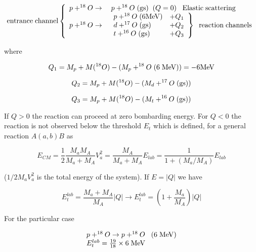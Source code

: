 \begin{equation}
{\rm entrance\;channel} \left\{
\begin{array}{rl}
p+^{18}O \rightarrow & \;p + ^{18}O \;({\rm gs})\;\; (Q=0) \;\;\; {\rm Elastic\; scattering} \\
p+^{18}O \rightarrow & \left. \begin{array}{ll}
     p + ^{18}O \;({\rm 6 MeV}) & + Q_1 \\
     d + ^{17}O \;({\rm gs})    & + Q_2 \\
     t + ^{16}O \;({\rm gs})    & + Q_3
		 \end{array} \right\} \;\; {\rm reaction\;channels}
\end{array}
\right.
\end{equation}

\noindent where

\begin{equation}
Q_1 = M_p + M(^{18}O) - (M_p + ^{18}O \; (6 \;{\rm MeV})) = -6 {\rm MeV}
\end{equation}

\begin{equation}
Q_2 = M_p + M(^{18}O) - (M_d + ^{17}O \; ({\rm gs}))
\end{equation}

\begin{equation}
Q_3 = M_p + M(^{18}O) - (M_t + ^{16}O \; ({\rm gs}))
\end{equation}

\noindent If $Q>0$ the reaction can proceed at zero bombarding energy. For $Q<0$ the reaction is not observed below the threshold $E_t$ which is defined, for a general reaction $A(a,b)B$ as

\begin{equation}
E_{CM} = \frac{1}{2} \frac{M_a M_A}{M_a + M_A} V_a^2 = \frac{M_A}{M_a + M_A} E_{lab} = \frac{1}{1+(M_a/M_A)} E_{lab}
\end{equation}

\noindent ($1/2 M_a V_a^2$ is the total energy of the system). If $E=|Q|$ we have

\begin{equation}
E_t^{lab} = \frac{M_a + M_A}{M_A} |Q| \rightarrow E_t^{lab} = \left( 1+ \frac{M_a}{M_A} \right)  |Q|
\end{equation}

\noindent For the particular case

\begin{equation}
\begin{array}{l}
p + ^{18}O \rightarrow p + ^{18}O \;\;\; (6 \;{\rm MeV}) \\
E_t^{lab} = \frac{19}{18} \times 6 \;{\rm MeV}
\end{array}
\end{equation}

